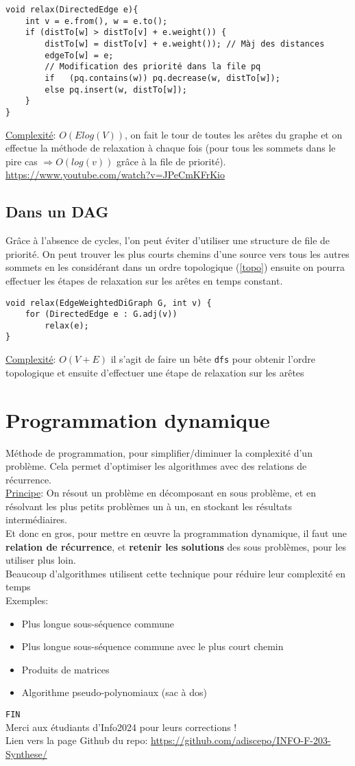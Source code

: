 \documentclass[10pt]{article}
\begin{document}
\begin{verbatim}
void relax(DirectedEdge e){
	int v = e.from(), w = e.to();
	if (distTo[w] > distTo[v] + e.weight()) {
		distTo[w] = distTo[v] + e.weight()); // Màj des distances
		edgeTo[w] = e;
		// Modification des priorité dans la file pq
		if   (pq.contains(w)) pq.decrease(w, distTo[w]); 
		else pq.insert(w, distTo[w]);
	}
}
\end{verbatim}

\underline{Complexité}: $O(Elog(V))$, on fait le tour de toutes les arêtes du graphe et on effectue la méthode de relaxation à chaque fois (pour tous les sommets dans le pire cas $\Rightarrow O(log(v))$ grâce à la file de priorité).
\\\url{https://www.youtube.com/watch?v=JPeCmKFrKio}

\subsection{Dans un DAG}
Grâce à l'absence de cycles, l'on peut éviter d'utiliser une structure de file de priorité. On peut trouver les plus courts chemins d'une source vers tous les autres sommets en les considérant dans un ordre topologique (\ref{topo}) ensuite on pourra effectuer les étapes de relaxation sur les arêtes en temps constant.

\begin{verbatim}
void relax(EdgeWeightedDiGraph G, int v) {
	for (DirectedEdge e : G.adj(v))
		relax(e);
}
\end{verbatim}
\underline{Complexité}: $O(V + E)$ il s'agit de faire un bête \verb|dfs| pour obtenir l'ordre topologique et ensuite d'effectuer une étape de relaxation sur les arêtes
\section{Programmation dynamique}
Méthode de programmation, pour simplifier/diminuer la complexité d’un problème. Cela permet d’optimiser les algorithmes avec des relations de récurrence.
\\\underline{Principe}: On résout un problème en décomposant en sous problème, et en résolvant les plus petits problèmes un à un, en stockant les résultats intermédiaires.
\\Et donc en gros, pour mettre en œuvre la programmation dynamique, il faut une \textbf{relation de récurrence}, et \textbf{retenir les solutions} des sous problèmes, pour les utiliser plus loin.
\\Beaucoup d'algorithmes utilisent cette technique pour réduire leur complexité en temps
\\Exemples:
\begin{itemize}
\item Plus longue sous-séquence commune
\item Plus longue sous-séquence commune avec le plus court chemin
\item Produits de matrices
\item Algorithme pseudo-polynomiaux (sac à dos)
\end{itemize}

\verb|FIN|\\
Merci aux étudiants d'Info2024 pour leurs corrections !
\\Lien vers la page Github du repo: \url{https://github.com/adiscepo/INFO-F-203-Synthese/}
\end{document}
